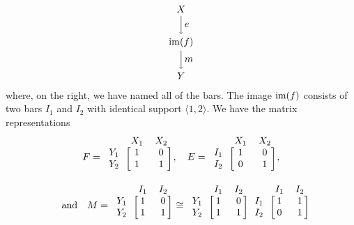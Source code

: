 \begin{example}
\[\begin{tikzpicture}[scale = 0.4, baseline={([yshift=-.5ex]current bounding box.center)}]
      \node (X) at (11, 6.5) {$X$};
      \node (im) at (11, 3.5) {$\im(f)$};
      \node (Y) at (11, .5) {$Y$};
      \draw[->] (X) -- node[right] {$e$} (im);
      \draw[->] (im) -- node[right] {$m$} (Y);
    \end{tikzpicture}
  \]
  where, on the right, we have named all of the bars. The image $\operatorname{im}(f)$ consists of two bars $I_1$ and $I_2$ with identical support $\langle 1, 2 \rangle$. We have the matrix representations
  \begin{gather*}
  F = \begin{blockarray}{c cc}
    & X_1 & X_2 \\
    \begin{block}{c [cc]}
      Y_1 & 1 & 0 \\
      Y_2 & 1 & 1 \\
    \end{block}
  \end{blockarray},
  \quad E = \begin{blockarray}{c cc}
    & X_1 & X_2 \\
    \begin{block}{c [cc]}
      I_1 & 1 & 0 \\
      I_2 & 0 & 1 \\
    \end{block}
  \end{blockarray},
  \\
  \quad \text{and} \quad
  M = \begin{blockarray}{c cc}
    & I_1 & I_2 \\
    \begin{block}{c [cc]}
      Y_1 & 1 & 0 \\
      Y_2 & 1 & 1 \\
    \end{block}
  \end{blockarray}
  \cong \begin{blockarray}{c cc}
    & I_1 & I_2 \\
    \begin{block}{c [cc]}
      Y_1 & 1 & 0 \\
      Y_2 & 1 & 1 \\
    \end{block}
  \end{blockarray}
  \begin{blockarray}{c cc}
    & I_1 & I_2 \\
    \begin{block}{c [cc]}
      I_1 & 1 & 1 \\
      I_2 & 0 & 1 \\

\end{block}
\end{blockarray}
\end{gather*}
\end{example}
